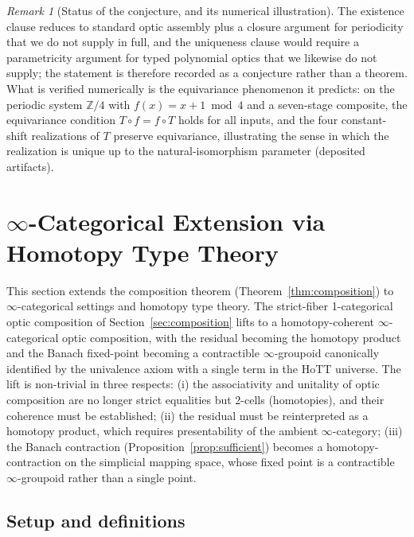 \documentclass[11pt,a4paper]{article}
\theoremstyle{plain}
\theoremstyle{definition}
\theoremstyle{remark}
\newtheorem{remark}[theorem]{Remark}
\begin{document}
\begin{remark}[Status of the conjecture, and its numerical
illustration]\label{rem:functorial-status}
The existence clause reduces to standard optic assembly plus a
closure argument for periodicity that we do not supply in full,
and the uniqueness clause would require a parametricity argument
for typed polynomial optics that we likewise do not supply; the
statement is therefore recorded as a conjecture rather than a
theorem. What is verified numerically is the equivariance
phenomenon it predicts: on the periodic system
$\mathbb Z/4$ with $f(x)=x+1\bmod4$ and a seven-stage composite,
the equivariance condition $T\circ f=f\circ T$ holds for all
inputs, and the four constant-shift realizations of $T$ preserve
equivariance, illustrating the sense in which the realization is
unique up to the natural-isomorphism parameter (deposited
artifacts).
\end{remark}


\section{$\infty$-Categorical Extension via Homotopy Type Theory}\label{sec:hott}

This section extends the composition theorem
(Theorem~\ref{thm:composition})
to $\infty$-categorical settings and homotopy type theory. The
strict-fiber 1-categorical optic composition of
Section~\ref{sec:composition} lifts to a homotopy-coherent
$\infty$-categorical optic composition, with the residual becoming the
homotopy product and the Banach fixed-point becoming a contractible
$\infty$-groupoid canonically identified by the univalence axiom with a
single term in the HoTT universe. The lift is non-trivial in three
respects: (i) the associativity and unitality of optic composition are
no longer strict equalities but 2-cells (homotopies), and their
coherence must be established; (ii) the residual must be reinterpreted
as a homotopy product, which requires presentability of the ambient
$\infty$-category; (iii) the Banach contraction
(Proposition~\ref{prop:sufficient}) becomes a homotopy-contraction on
the simplicial mapping space, whose fixed point is a contractible
$\infty$-groupoid rather than a single point.

\subsection{Setup and definitions}
\end{document}
